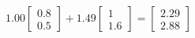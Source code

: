 \documentclass[preview]{standalone}
\begin{document}
\begin{align*}
1.00 \begin{bmatrix} 0.8 \\ 0.5 \end{bmatrix} + 1.49 \begin{bmatrix} 1 \\ 1.6 \end{bmatrix} = \begin{bmatrix} 2.29 \\ 2.88 \end{bmatrix}
\end{align*}
\end{document}
